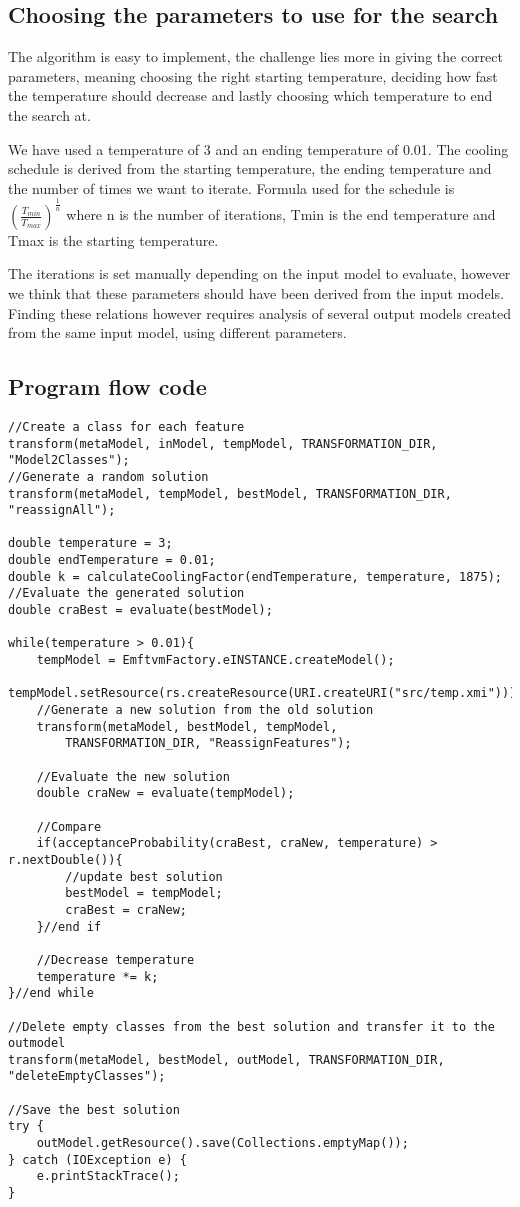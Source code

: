 \documentclass[a4paper]{article}
\begin{document}
\subsection{Choosing the parameters to use for the search}

The algorithm is easy to implement, the challenge lies more in giving the correct parameters, meaning choosing the right starting temperature, deciding how fast the temperature should decrease and lastly choosing which temperature to end the search at.

We have used a temperature of 3 and an ending temperature of 0.01.
The cooling schedule is derived from the starting temperature, the ending temperature and the number of times we want to iterate.
Formula used for the schedule is $(\frac{T_{min}}{T_{max}})^\frac{1}{n}$ where n is the number of iterations, Tmin is the end temperature and Tmax is the starting temperature.

The iterations is set manually depending on the input model to evaluate, however we think that these parameters should have been derived from the input models.
Finding these relations however requires analysis of several output models created from the same input model, using different parameters.


\subsection{Program flow code}

\begin{lstlisting}
//Create a class for each feature
transform(metaModel, inModel, tempModel, TRANSFORMATION_DIR, "Model2Classes");
//Generate a random solution
transform(metaModel, tempModel, bestModel, TRANSFORMATION_DIR, "reassignAll");

double temperature = 3;
double endTemperature = 0.01;
double k = calculateCoolingFactor(endTemperature, temperature, 1875);
//Evaluate the generated solution
double craBest = evaluate(bestModel);

while(temperature > 0.01){
	tempModel = EmftvmFactory.eINSTANCE.createModel();
	tempModel.setResource(rs.createResource(URI.createURI("src/temp.xmi")));
	//Generate a new solution from the old solution
	transform(metaModel, bestModel, tempModel,
		TRANSFORMATION_DIR, "ReassignFeatures");

	//Evaluate the new solution
	double craNew = evaluate(tempModel);

	//Compare
	if(acceptanceProbability(craBest, craNew, temperature) > r.nextDouble()){
		//update best solution
		bestModel = tempModel;
		craBest = craNew;
	}//end if

	//Decrease temperature
	temperature *= k;
}//end while

//Delete empty classes from the best solution and transfer it to the outmodel
transform(metaModel, bestModel, outModel, TRANSFORMATION_DIR,
"deleteEmptyClasses");

//Save the best solution
try {
	outModel.getResource().save(Collections.emptyMap());
} catch (IOException e) {
	e.printStackTrace();
}
\end{lstlisting}
\end{document}
